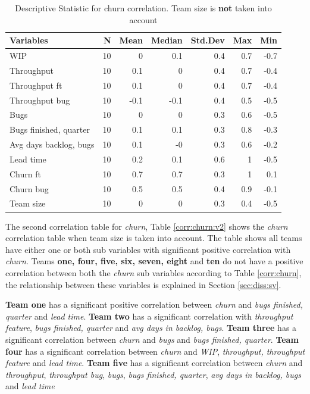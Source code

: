 \documentclass[UKenglish]{ifimaster}  %
\begin{document}
\begin{minipage}[t]{\linewidth}
\begin{table}[H]
 \caption{Descriptive Statistic for churn correlation.  Team size is \textbf{not} taken into account}
\centering
 \begin{tabular}{ | l | r | r | r | r | r | r | }
 \hline
\textbf{Variables}& \bf{N} & \bf{Mean} & \bf{Median} & \bf{Std.Dev} & \bf{Max} & \bf{Min} \\ \hline
WIP  & 10 & 0 & 0.1 & 0.4 & 0.7 & -0.7\\ \hline
Throughput  & 10 & 0.1 & 0 & 0.4 & 0.7 & -0.4\\ \hline
Throughput ft  & 10 & 0.1 & 0 & 0.4 & 0.7 & -0.4\\ \hline
Throughput bug  & 10 & -0.1 & -0.1 & 0.4 & 0.5 & -0.5\\ \hline
Bugs  & 10 & 0 & 0 & 0.3 & 0.6 & -0.5\\ \hline
Bugs finished, quarter  & 10 & 0.1 & 0.1 & 0.3 & 0.8 & -0.3\\ \hline
Avg days backlog, bugs  & 10 & 0.1 & -0 & 0.3 & 0.6 & -0.2\\ \hline
Lead time & 10 & 0.2 & 0.1 & 0.6 & 1 & -0.5\\ \hline
Churn ft  & 10 & 0.7 & 0.7 & 0.3 & 1 & 0.1\\ \hline
Churn bug  & 10 & 0.5 & 0.5 & 0.4 & 0.9 & -0.1\\ \hline
Team size  & 10 & 0 & 0 & 0.3 & 0.4 & -0.5\\ \hline
\end{tabular}
 \label{DS:corr:Churn}
  \end{table}
  \end{minipage}
 
The second correlation table for \textit{churn}, Table \ref{corr:churn:v2} shows the \textit{churn} correlation table when team size is taken into account. The table shows all teams have either one or both sub variables with significant positive correlation with \textit{churn}. Teams \textbf{one, four, five, six, seven, eight} and \textbf{ten} do not have a positive correlation between both the \textit{churn} sub variables according to Table \ref{corr:churn}, the relationship between these variables is explained in Section \ref{sec:diss:sv}. 

\textbf{Team one} has a significant positive correlation between \textit{churn} and  \textit{bugs finished, quarter} and \textit{lead time}.  \textbf{Team two} has a significant correlation with \textit{throughput feature}, \textit{bugs finished, quarter} and \textit{avg days in backlog, bugs}. \textbf{Team three} has a significant correlation between \textit{churn} and \textit{bugs} and \textit{bugs finished, quarter}.  \textbf{Team four} has a significant correlation between \textit{churn} and  \textit{WIP}, \textit{throughput, throughput feature} and \textit{lead time}. \textbf{Team five} has a significant correlation between \textit{churn} and  \textit{throughput}, \textit{throughput bug}, \textit{bugs}, \textit{bugs finished, quarter}, \textit{avg days in backlog, bugs} and \textit{lead time} 
\end{document}
